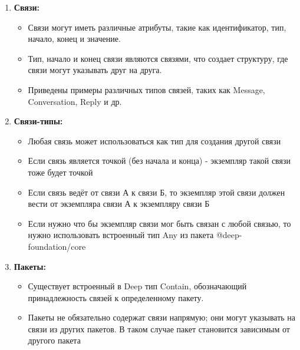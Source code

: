 \documentclass{article}
\begin{document}
\begin{enumerate}
  \item \textbf{Связи:}
        \begin{itemize}
          \item Связи могут иметь различные атрибуты, такие как идентификатор,
                тип, начало, конец и значение.
          \item Тип, начало и конец связи являются связями, что создает
                структуру, где связи могут указывать друг на друга.
          \item Приведены примеры различных типов связей, таких как Message,
                Conversation, Reply и др.
        \end{itemize}

  \item \textbf{Связи-типы:}
        \begin{itemize}
          \item Любая связь может использоваться как тип для создания другой
                связи
          \item Если связь является точкой (без начала и конца) - экземпляр
                такой связи тоже будет точкой
          \item Если связь ведёт от связи А к связи Б, то экземпляр этой связи
                должен вести от экземпляра связи А к экземпляру связи Б
          \item Если нужно что бы экземпляр связи мог быть связан с любой
                связью,
                то нужно использовать встроенный тип Any из пакета
                @deep-foundation/core
        \end{itemize}

  \item \textbf{Пакеты:}
        \begin{itemize}
          \item Существует встроенный в Deep тип Contain, обозначающий
                принадлежность связей к определенному пакету.
          \item Пакеты не обязательно содержат связи напрямую; они могут
                указывать на связи из других пакетов. В таком случае пакет
                становится зависимым от другого пакета
        \end{itemize}


\end{enumerate}
\end{document}

